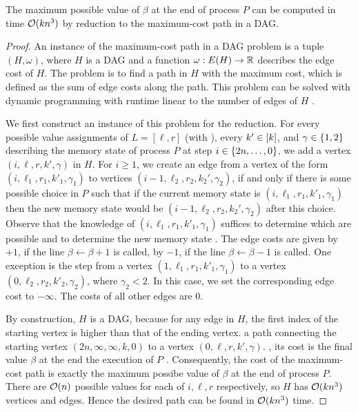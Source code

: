 \begin{lemma}
\label{lem:ham_path}
The maximum possible value of $\beta$ at the end of process $P$ can be computed in time $\mathcal{O}(kn^3)$ by reduction to the maximum-cost path in a DAG.
\end{lemma}
\begin{proof}
An instance of the maximum-cost path in a DAG problem is a tuple $(H, \omega)$, where $H$ is a DAG and a function $\omega: E(H) \to \mathbb{R}$ describes the edge cost of $H$.
The problem is to find a path in $H$ with the maximum cost, which is defined as the sum of edge costs along the path.
This problem can be solved with dynamic programming with runtime linear to the number of edges  of $H$ .

We first construct an instance of this problem for the reduction. 
For every possible value assignments of $L = [\ell, r]$ (with ), every $k' \in [k]$, and $\gamma \in \{ 1,2 \}$ describing the memory state of process $P$ at step $i \in \{ 2n, \ldots, 0 \}$, we add a vertex $(i,\ell,r,k',\gamma)$ in $H$. 
For $i \geq 1$, we create an edge from a vertex of the form $(i,\ell_1,r_1,k'_1,\gamma_1)$ to vertices $(i-1,\ell_2,r_2,k_2',\gamma_2)$, if and only if there is some possible choice in $P$ such that if the current memory state is $(i,\ell_1,r_1,k'_1,\gamma_1)$ then the new memory state would be $(i-1, \ell_2, r_2, k_2',\gamma_2)$ after this choice. 
Observe that the knowledge of $(i, \ell_1, r_1, k'_1,\gamma_1)$ suffices to determine which  are possible and to determine the new memory state . 
The edge costs are given by $+1$, if the line $\beta \leftarrow \beta + 1$ is called, by $-1$, if the line $\beta \leftarrow \beta- 1$ is called.
One exception is the step from a vertex $(1,\ell_1,r_1,k'_1,\gamma_1)$ to a vertex $(0,\ell_2,r_2,k'_2,\gamma_2)$, where $\gamma_2 < 2$.
In this case, we set the corresponding edge cost to $-\infty$.
The costs of all other edges are 0.

By construction, $H$ is a DAG, because for any edge in $H$, the first index of the starting vertex is higher than that of the ending vertex.
 a path connecting the starting vertex $(2n, \infty, \infty, k, 0)$ to a vertex $(0, \ell, r, k', \gamma)$. , its cost is the final value  $\beta$ at the end  the execution of $P$ .
Consequently, the cost of the maximum-cost path is exactly the maximum possibe value of $\beta$ at the end of process $P$. 
There are $\mathcal{O}(n)$ possible values for each of $i, \ell, r$ respectively, so $H$ has $\mathcal{O}(kn^3)$ vertices and edges. Hence the desired path can be found in $\mathcal{O}(kn^3)$ time.
 
\end{proof}

